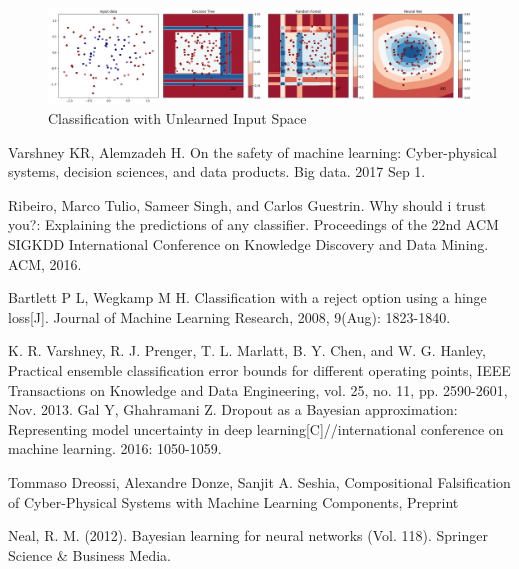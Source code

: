 \documentclass[11pt,onecolumn]{IEEEtran}
\begin{document}
\begin{figure}[h!]
  \label{fig:2}
  \caption{Classification with Unlearned Input Space}
  \includegraphics[width=1\linewidth]{image/C2.png}
\end{figure}



\renewcommand{\refname}{~}
\begin{thebibliography}{1}

 Varshney KR, Alemzadeh H. On the safety of machine learning: Cyber-physical systems, decision sciences, and data products. Big data. 2017 Sep 1.



 Ribeiro, Marco Tulio, Sameer Singh, and Carlos Guestrin. Why should i trust you?: Explaining the predictions of any classifier. Proceedings of the 22nd ACM SIGKDD International Conference on Knowledge Discovery and Data Mining. ACM, 2016.


 Bartlett P L, Wegkamp M H. Classification with a reject option using a hinge loss[J]. Journal of Machine Learning Research, 2008, 9(Aug): 1823-1840.

 K. R. Varshney, R. J. Prenger, T. L. Marlatt, B. Y. Chen, and W. G. Hanley, Practical ensemble classification error bounds for different operating points, IEEE Transactions on Knowledge and Data Engineering, vol. 25, no. 11, pp. 2590-2601, Nov. 2013.
 Gal Y, Ghahramani Z. Dropout as a Bayesian approximation: Representing model uncertainty in deep learning[C]//international conference on machine learning. 2016: 1050-1059.

 Tommaso Dreossi, Alexandre Donze,  Sanjit A. Seshia, Compositional Falsification of Cyber-Physical Systems with Machine Learning Components, Preprint

 Neal, R. M. (2012). Bayesian learning for neural networks (Vol. 118). Springer Science \& Business Media.
%



\end{thebibliography}
\end{document}
